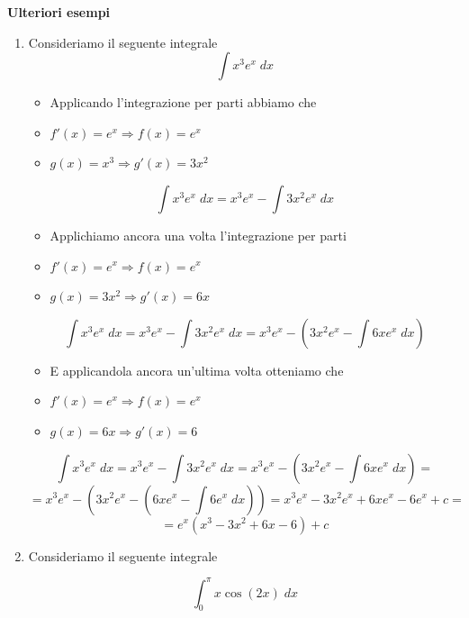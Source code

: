 \documentclass[a4paper, 12pt]{report}
\begin{document}
    \textbf{Ulteriori esempi}
    
    \begin{enumerate}
        \item Consideriamo il seguente integrale
        \[ \int x^3 e^x \; dx\]
        
        \begin{itemize}
            \item Applicando l'integrazione per parti abbiamo che
            \item $f'(x) = e^x \Longrightarrow f(x) = e^x$
            \item $g(x) = x^3 \Longrightarrow g'(x) = 3x^2$
        \end{itemize}
        
        \[ \int x^3 e^x \; dx = x^3e^x - \int 3x^2e^x \; dx\]
        
        \begin{itemize}
            \item Applichiamo ancora una volta l'integrazione per parti
            \item $f'(x) = e^x \Longrightarrow f(x) = e^x$
            \item $g(x) = 3x^2 \Longrightarrow g'(x) = 6x$
        \end{itemize}
        
        \[ \int x^3 e^x \; dx = x^3e^x - \int 3x^2e^x \; dx = x^3e^x - \left ( 3x^2e^x - \int 6xe^x \; dx \right )\]
        
        \begin{itemize}
            \item E applicandola ancora un'ultima volta otteniamo che
            \item $f'(x) = e^x \Longrightarrow f(x) = e^x$
            \item $g(x) = 6x \Longrightarrow g'(x) = 6$
        \end{itemize}
        
        \[ \int x^3 e^x \; dx = x^3e^x - \int 3x^2e^x \; dx = x^3e^x - \left ( 3x^2e^x - \int 6xe^x \; dx \right ) =\]
        \[ = x^3e^x - \left ( 3x^2e^x - \left ( 6xe^x - \int 6e^x \; dx \right ) \right ) = x^3e^x - 3x^2e^x + 6xe^x - 6e^x + c= \]
        \[ = e^x(x^3 - 3x^2 + 6x - 6) + c\]
        
        \item Consideriamo il seguente integrale
        
        \[ \int_{0}^{\pi} x \cos(2x) \; dx\]
        

\end{enumerate}
\end{document}
